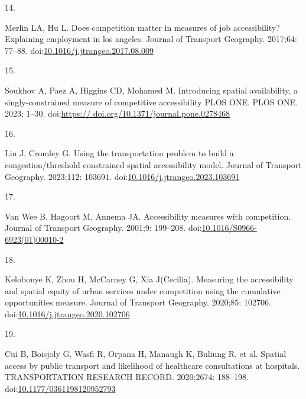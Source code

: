 \documentclass[10pt,letterpaper]{article}
\newlength{\cslhangindent}
\newlength{\csllabelwidth}
\newlength{\cslentryspacingunit} %
\newenvironment{CSLReferences}[2] %
 {%
  \setlength{\parindent}{0pt}
  \ifodd #1
  \let\oldpar\par
  \def\par{\hangindent=\cslhangindent\oldpar}
  \fi
  \setlength{\parskip}{#2\cslentryspacingunit}
 }%
 {}
\newcommand{\CSLLeftMargin}[1]{\parbox[t]{\csllabelwidth}{#1}}
\newcommand{\CSLRightInline}[1]{\parbox[t]{\linewidth - \csllabelwidth}{#1}\break}
\begin{document}
\begin{CSLReferences}{0}{0}
\leavevmode{}%
\CSLLeftMargin{14. }%
\CSLRightInline{Merlin LA, Hu L. Does competition matter in measures of
job accessibility? Explaining employment in los angeles. Journal of
Transport Geography. 2017;64: 77--88.
doi:\href{https://doi.org/10.1016/j.jtrangeo.2017.08.009}{10.1016/j.jtrangeo.2017.08.009}}

\leavevmode{}%
\CSLLeftMargin{15. }%
\CSLRightInline{Soukhov A, Paez A, Higgins CD, Mohamed M. Introducing
spatial availability, a singly-constrained measure of competitive
accessibility \textbar{} {PLOS ONE}. PLOS ONE. 2023; 1--30.
doi:\href{https://\%20doi.org/10.1371/journal.pone.0278468}{https://
doi.org/10.1371/journal.pone.0278468}}

\leavevmode{}%
\CSLLeftMargin{16. }%
\CSLRightInline{Lin J, Cromley G. Using the transportation problem to
build a congestion/threshold constrained spatial accessibility model.
Journal of Transport Geography. 2023;112: 103691.
doi:\href{https://doi.org/10.1016/j.jtrangeo.2023.103691}{10.1016/j.jtrangeo.2023.103691}}

\leavevmode{}%
\CSLLeftMargin{17. }%
\CSLRightInline{Van Wee B, Hagoort M, Annema JA. Accessibility measures
with competition. Journal of Transport Geography. 2001;9: 199--208.
doi:\href{https://doi.org/10.1016/S0966-6923(01)00010-2}{10.1016/S0966-6923(01)00010-2}}

\leavevmode{}%
\CSLLeftMargin{18. }%
\CSLRightInline{Kelobonye K, Zhou H, McCarney G, Xia J(Cecilia).
Measuring the accessibility and spatial equity of urban services under
competition using the cumulative opportunities measure. Journal of
Transport Geography. 2020;85: 102706.
doi:\href{https://doi.org/10.1016/j.jtrangeo.2020.102706}{10.1016/j.jtrangeo.2020.102706}}

\leavevmode{}%
\CSLLeftMargin{19. }%
\CSLRightInline{Cui B, Boisjoly G, Wasfi R, Orpana H, Manaugh K, Buliung
R, et al. Spatial access by public transport and likelihood of
healthcare consultations at hospitals. {TRANSPORTATION} {RESEARCH}
{RECORD}. 2020;2674: 188--198.
doi:\href{https://doi.org/10.1177/0361198120952793}{10.1177/0361198120952793}}


\end{CSLReferences}
\end{document}
